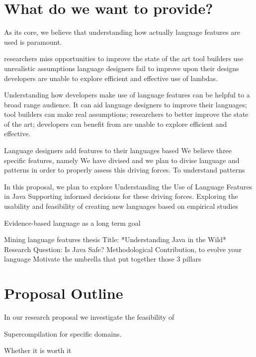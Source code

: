 \section{What do we want to provide?}


As its core, we believe that understanding how actually language features are
used is paramount.

researchers miss opportunities to improve the state of the art
tool builders use unrealistic assumptions
language designers fail to improve upon their designs
developers are unable to explore efficient and effective use of lambdas.

Understanding how developers make use of language features can be helpful to a broad range audience.
It can aid language designers to improve their languages;
tool builders can make real assumptions;
researchers to better improve the state of the art;
developers can benefit from are unable to explore efficient and effective.

Language designers add features to their languages based
We believe
three specific features, namely
We have divised and we plan to divise language and \api{} patterns in order to properly assess this driving forces.
To understand patterns

In this proposal, we plan to explore
Understanding the Use of Language Features in Java
Supporting informed decisions for these driving forces.
Exploring the usability and feasibility of creating new languages based on empirical studies



Evidence-based language as a long term goal

Mining language features thesis
Title: *Understanding Java in the Wild*
Research Question: Is Java Safe?
Methodological Contribution, to evolve your language
Motivate the umbrella that put together those 3 pillars


\section{Proposal Outline}

In our research proposal we investigate the feasibility of 

Supercompilation for specific domains.

Whether it is worth it

